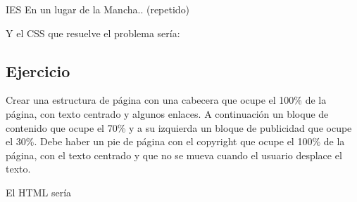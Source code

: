 \documentclass[letterpaper,10pt,spanish]{sphinxmanual}
\begin{document}
\begin{sphinxVerbatim}[commandchars=\\\{\}]
 
                         IES
 
        En un lugar de la Mancha.. (repetido)


\end{sphinxVerbatim}

Y el CSS que resuelve el problema sería:


\subsection{Ejercicio}
\label{\detokenize{tema3:ejercicio}}
Crear una estructura de página con una cabecera que ocupe el 100\% de la página, con texto centrado y algunos enlaces. A continuación un bloque de contenido que ocupe el 70\% y a su izquierda un bloque de publicidad que ocupe el 30\%. Debe haber un pie de página con el copyright que ocupe el 100\% de la página, con el texto centrado y que no se mueva cuando el usuario desplace el texto.

El HTML sería
\end{document}
